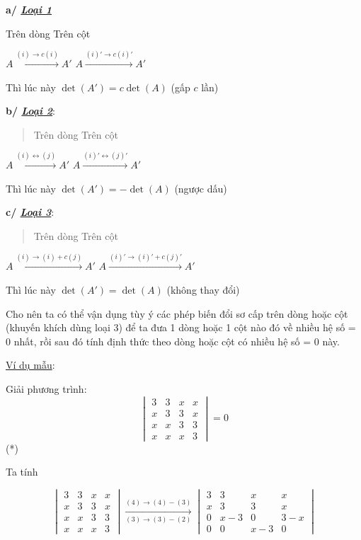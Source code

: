 \documentclass[
]{article}
\let\ul\uline
\begin{document}
\textbf{a/ \emph{\ul{Loại 1}}}

Trên dòng Trên cột

$A \xrightarrow{(i) \rightarrow c(i)} A'$
$A \xrightarrow{(i)' \rightarrow c(i)'} A'$

Thì lúc này $\det(A') = c \det(A)$
(gấp $c$ lần)

\textbf{b/ \emph{\ul{Loại 2}}}:

\begin{quote}
Trên dòng Trên cột
\end{quote}

$A \xrightarrow{(i) \leftrightarrow (j)} A'$
$A \xrightarrow{(i)' \leftrightarrow (j)'} A'$

Thì lúc này $\det(A') = -\det(A)$
(ngược dấu)

\textbf{c/ \emph{\ul{Loại 3}}}:

\begin{quote}
Trên dòng Trên cột
\end{quote}

$A \xrightarrow{(i) \rightarrow (i) + c(j)} A'$
$A \xrightarrow{(i)' \rightarrow (i)' + c(j)'} A'$

Thì lúc này $\det(A') = \det(A)$
(không thay đổi)

Cho nên ta có thể vận dụng tùy ý các phép biến đổi sơ cấp trên dòng hoặc
cột (khuyến khích dùng loại 3) để ta đưa 1 dòng hoặc 1 cột nào đó về
nhiều hệ số = 0 nhất, rồi sau đó tính định thức theo dòng hoặc cột có
nhiều hệ số = 0 này.

\ul{Ví dụ mẫu}:

Giải phương trình:
$$\begin{vmatrix} 3 & 3 & x & x \\ x & 3 & 3 & x \\ x & x & 3 & 3 \\ x & x & x & 3 \end{vmatrix} = 0$$ (*)

Ta tính

$$\begin{vmatrix} 3 & 3 & x & x \\ x & 3 & 3 & x \\ x & x & 3 & 3 \\ x & x & x & 3 \end{vmatrix} \xrightarrow[(3) \rightarrow (3)-(2)]{(4) \rightarrow (4)-(3)} \begin{vmatrix} 3 & 3 & x & x \\ x & 3 & 3 & x \\ 0 & x-3 & 0 & 3-x \\ 0 & 0 & x-3 & 0 \end{vmatrix}$$
\end{document}

